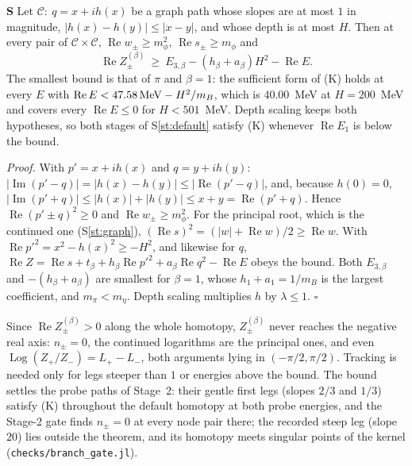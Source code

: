\documentclass[11pt]{article}
\newcommand{\file}[1]{\nolinkurl{#1}}
\newcounter{stmt}
\newenvironment{stmt}[1]{\par\smallskip\refstepcounter{stmt}\noindent\textbf{S\thestmt}\enspace[\textsf{#1}]\enspace\ignorespaces}{\par\smallskip}
\newcommand{\Sr}[1]{S\ref{#1}}
\begin{document}
\begin{stmt}{theorem}\label{st:slope}
Let $\mathcal C:\ q=x+ih(x)$ be a graph path whose slopes are at most $1$ in magnitude, $|h(x)-h(y)|\le|x-y|$, and whose depth is at most $H$. Then at every pair of $\mathcal C\times\mathcal C$, $\operatorname{Re}w_\pm\ge m_\phi^2$, $\operatorname{Re}s_\pm\ge m_\phi$ and
\[
\operatorname{Re}Z^{(\beta)}_\pm\ \ge\ E_{3,\beta}-(h_\beta+a_\beta)H^2-\operatorname{Re}E .
\]
The smallest bound is that of $\pi$ and $\beta=1$: the sufficient form of (K) holds at every $E$ with $\operatorname{Re}E<47.58\,{\rm MeV}-H^2/m_B$, which is $40.00$~MeV at $H=200$~MeV and covers every $\operatorname{Re}E\le0$ for $H<501$~MeV. Depth scaling keeps both hypotheses, so both stages of \Sr{st:default} satisfy (K) whenever $\operatorname{Re}E_1$ is below the bound.
\end{stmt}
\noindent\emph{Proof.} With $p'=x+ih(x)$ and $q=y+ih(y)$: $|\operatorname{Im}(p'-q)|=|h(x)-h(y)|\le|\operatorname{Re}(p'-q)|$, and, because $h(0)=0$, $|\operatorname{Im}(p'+q)|\le|h(x)|+|h(y)|\le x+y=\operatorname{Re}(p'+q)$. Hence $\operatorname{Re}(p'\pm q)^2\ge0$ and $\operatorname{Re}w_\pm\ge m_\phi^2$. For the principal root, which is the continued one (\Sr{st:graph}), $(\operatorname{Re}s)^2=(|w|+\operatorname{Re}w)/2\ge\operatorname{Re}w$. With $\operatorname{Re}p'^2=x^2-h(x)^2\ge-H^2$, and likewise for $q$, $\operatorname{Re}Z=\operatorname{Re}s+t_\beta+h_\beta\operatorname{Re}p'^2+a_\beta\operatorname{Re}q^2-\operatorname{Re}E$ obeys the bound. Both $E_{3,\beta}$ and $-(h_\beta+a_\beta)$ are smallest for $\beta=1$, whose $h_1+a_1=1/m_B$ is the largest coefficient, and $m_\pi<m_\eta$. Depth scaling multiplies $h$ by $\lambda\le1$. $\square$

Since $\operatorname{Re}Z^{(\beta)}_\pm>0$ along the whole homotopy, $Z^{(\beta)}_\pm$ never reaches the negative real axis: $n_\pm=0$, the continued logarithms are the principal ones, and even $\operatorname{Log}(Z_+/Z_-)=L_+-L_-$, both arguments lying in $(-\pi/2,\pi/2)$. Tracking is needed only for legs steeper than $1$ or energies above the bound. The bound settles the probe paths of Stage~2: their gentle first legs (slopes $2/3$ and $1/3$) satisfy (K) throughout the default homotopy at both probe energies, and the Stage-2 gate finds $n_\pm=0$ at every node pair there; the recorded steep leg (slope $20$) lies outside the theorem, and its homotopy meets singular points of the kernel (\file{checks/branch_gate.jl}).
\end{document}
